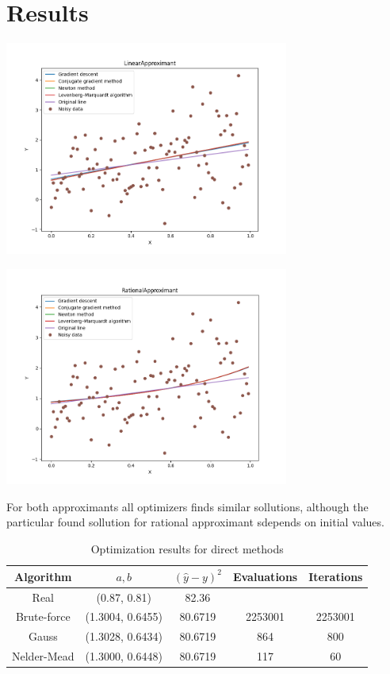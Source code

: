 \section*{Results}

\begin{center}
    \includegraphics[width=0.7\textwidth]{../results/linear.png}
\end{center}

\begin{center}
    \includegraphics[width=0.7\textwidth]{../results/rational.png}
\end{center}

For both approximants all optimizers finds similar sollutions, although the particular found sollution for rational approximant sdepends 
on initial values.


\begin{table}[h!]
    \begin{center}
        \caption{Optimization results for direct methods}
        \label{table:direct-methods}
        \begin{tabular}{|c|c|c|c|c|}
            \textbf{Algorithm} & \textbf{$a, b$} & \textbf{$(\hat{y} - y)^2$} & \textbf{Evaluations} & \textbf{Iterations}\\
            \hline
            Real & (0.87, 0.81) & 82.36 & &\\
            Brute-force & (1.3004, 0.6455) & 80.6719 & 2253001 & 2253001 \\
            Gauss & (1.3028, 0.6434) & 80.6719 & 864 & 800 \\
            Nelder-Mead & (1.3000, 0.6448) & 80.6719 & 117 & 60
        \end{tabular}
    \end{center}
\end{table}

